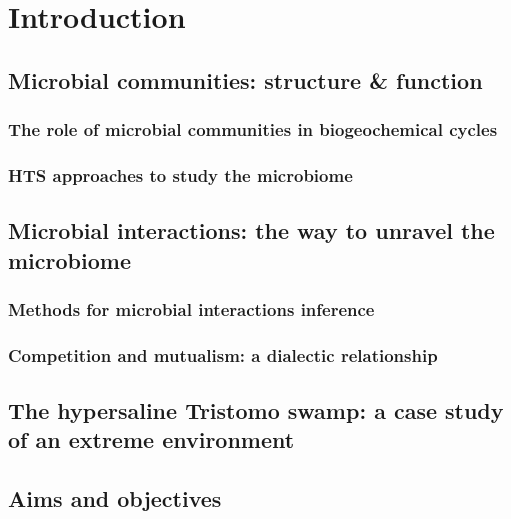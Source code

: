 \chapter{Introduction}
\label{cha:intro}


\section{Microbial communities: structure \& function}

\subsection{The role of microbial communities in biogeochemical cycles}

\subsection{HTS approaches to study the microbiome}


\section{Microbial interactions: the way to unravel the microbiome}

\subsection{Methods for microbial interactions inference}

\subsection{Competition and mutualism: a dialectic relationship}


\section{The hypersaline Tristomo swamp: a case study of an extreme environment}



\section{Aims and objectives}



